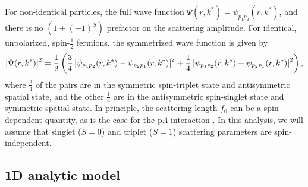For non-identical particles, the full wave function $\Psi(r,k^*) = \psi_{p_1p_2}(r,k^*)$, and there is no $(1 + (-1)^S)$ prefactor on the scattering amplitude. 
For identical, unpolarized, spin-$\frac{1}{2}$ fermions, the symmetrized wave function is given by 
\begin{equation}
\label{eq:SymmetrizedWaveFunction}
\left\lvert\Psi(r,k^*)\right\rvert^2 = \frac{1}{2}\left(\frac{3}{4} \left\lvert\psi_{p_1p_2}(r,k^*) - \psi_{p_2p_1}(r,k^*)\right\rvert^2
+ \frac{1}{4} \left\lvert\psi_{p_1p_2}(r,k^*) + \psi_{p_2p_1}(r,k^*)\right\rvert^2\right),
\end{equation}
where $\frac{3}{4}$ of the pairs are in the symmetric spin-triplet state and antisymmetric spatial state, and the other $\frac{1}{4}$ are in the antisymmetric spin-singlet state and symmetric spatial state.
In principle, the scattering length $f_0$ can be a spin-dependent quantity, as is the case for the p$\Lambda$ interaction \cite{Adams:2005ws}.
In this analysis, we will assume that singlet ($S=0$) and triplet ($S=1$) scattering parameters are spin-independent.

\subsection{1D analytic model}
\label{sec:AnalyticModel}

